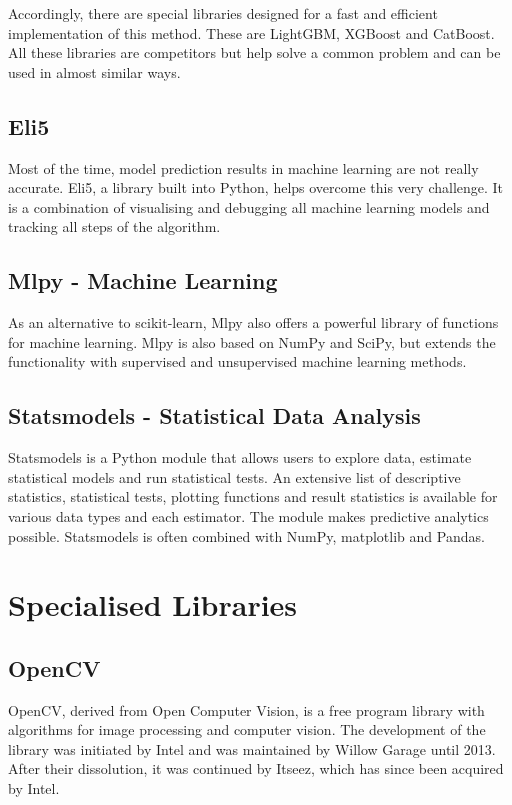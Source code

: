 Accordingly, there are special libraries designed for a fast and efficient implementation of this method. These are LightGBM, XGBoost and CatBoost. All these libraries are competitors but help solve a common problem and can be used in almost similar ways.

\subsection{Eli5}

Most of the time, model prediction results in machine learning are not really accurate. Eli5, a library built into Python, helps overcome this very challenge. It is a combination of visualising and debugging all machine learning models and tracking all steps of the algorithm.

\subsection{Mlpy - Machine Learning}

As an alternative to scikit-learn, Mlpy also offers a powerful library of functions for machine learning. Mlpy is also based on NumPy and SciPy, but extends the functionality with supervised and unsupervised machine learning methods.

\subsection{Statsmodels - Statistical Data Analysis}

Statsmodels is a Python module that allows users to explore data, estimate statistical models and run statistical tests. An extensive list of descriptive statistics, statistical tests, plotting functions and result statistics is available for various data types and each estimator.
The module makes predictive analytics possible. Statsmodels is often combined with NumPy, matplotlib and Pandas.



\section{Specialised Libraries}


\subsection{OpenCV}


OpenCV, derived from Open Computer Vision, is a free program library with algorithms for image processing and computer vision. The development of the library was initiated by Intel and was maintained by Willow Garage until 2013. After their dissolution, it was continued by Itseez, which has since been acquired by Intel. \cite{OpenCV:2020b}


